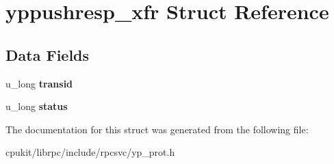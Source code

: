 \hypertarget{structyppushresp__xfr}{}\section{yppushresp\+\_\+xfr Struct Reference}
\label{structyppushresp__xfr}
\subsection*{Data Fields}
\begin{DoxyCompactItemize}
\item 
\mbox{\label{structyppushresp__xfr_af4f89da11b2c6ed3a492be652c14b7a0}} 
u\+\_\+long {\bfseries transid}
\item 
\mbox{\label{structyppushresp__xfr_a86d5a6c3da08e91149af3cd7fa6274d3}} 
u\+\_\+long {\bfseries status}
\end{DoxyCompactItemize}


The documentation for this struct was generated from the following file\+:\begin{DoxyCompactItemize}
\item 
cpukit/librpc/include/rpcsvc/yp\+\_\+prot.\+h\end{DoxyCompactItemize}

